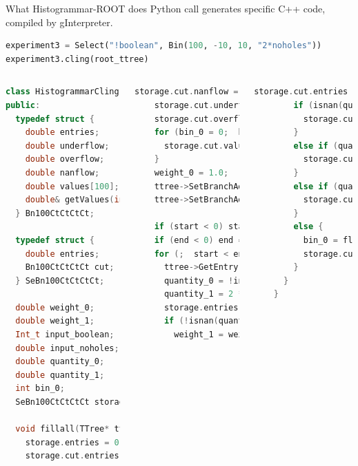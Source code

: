 \documentclass{beamer}
\begin{document}
\begin{frame}[fragile]{What Histogrammar-ROOT does}
\vspace{0.35 cm}
Python call generates specific C++ code, compiled by gInterpreter.

\begin{lstlisting}[language=python]
experiment3 = Select("!boolean", Bin(100, -10, 10, "2*noholes"))
experiment3.cling(root_ttree)
\end{lstlisting}

\begin{columns}
\begin{lstlisting}[language=cpp, basicstyle=\ttfamily\fontsize{5}{4}\selectfont]
class HistogrammarClingFiller_0 {
public:
  typedef struct {
    double entries;
    double underflow;
    double overflow;
    double nanflow;
    double values[100];
    double& getValues(int i) { return values[i]; }
  } Bn100CtCtCtCt;

  typedef struct {
    double entries;
    Bn100CtCtCtCt cut;
  } SeBn100CtCtCtCt;

  double weight_0;
  double weight_1;
  Int_t input_boolean;
  double input_noholes;
  double quantity_0;
  double quantity_1;
  int bin_0;
  SeBn100CtCtCtCt storage;

  void fillall(TTree* ttree, Long64_t start, Long64_t end) {
    storage.entries = 0.0;
    storage.cut.entries = 0.0;
\end{lstlisting}

\begin{lstlisting}[language=cpp, basicstyle=\ttfamily\fontsize{5}{4}\selectfont]
    storage.cut.nanflow = 0.0;
    storage.cut.underflow = 0.0;
    storage.cut.overflow = 0.0;
    for (bin_0 = 0;  bin_0 < 100;  ++bin_0) {
      storage.cut.values[bin_0] = 0.0;
    }
    weight_0 = 1.0;
    ttree->SetBranchAddress("noholes", &input_noholes);
    ttree->SetBranchAddress("boolean", &input_boolean);

    if (start < 0) start = 0;
    if (end < 0) end = ttree->GetEntries();
    for (;  start < end;  ++start) {
      ttree->GetEntry(start);
      quantity_0 = !input_boolean;
      quantity_1 = 2 * input_noholes;
      storage.entries += weight_0;
      if (!isnan(quantity_0)  &&  quantity_0 > 0.0) {
        weight_1 = weight_0 * quantity_0;
\end{lstlisting}

\begin{lstlisting}[language=cpp, basicstyle=\ttfamily\fontsize{5}{4}\selectfont]
        storage.cut.entries += weight_1;
        if (isnan(quantity_1)) {
          storage.cut.nanflow += weight_1;
        }
        else if (quantity_1 < -10.0) {
          storage.cut.underflow += weight_1;
        }
        else if (quantity_1 >= 10.0) {
          storage.cut.overflow += weight_1;
        }
        else {
          bin_0 = floor((quantity_1 - -10.0) * 5.0);
          storage.cut.values[bin_0] += weight_1;
        }
      }
    }


\end{lstlisting}
\end{columns}
\end{frame}
\end{document}
